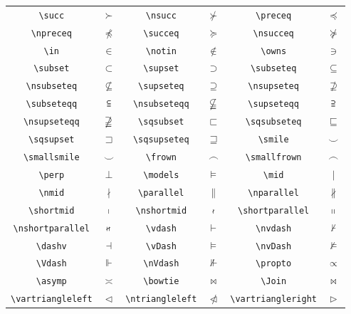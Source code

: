 \begin{tabular}{cc|cc|cc}
    \lstinline!\succ! & $\succ$ & \lstinline!\nsucc! & $\nsucc$ & \lstinline!\preceq! & $\preceq$ \\
    \lstinline!\npreceq! & $\npreceq$  & \lstinline!\succeq! & $\succeq$ & \lstinline!\nsucceq! & $\nsucceq$ \\
    \lstinline!\in! & $\in$ & \lstinline!\notin! & $\notin$ & \lstinline!\owns! & $\owns$ \\
    \lstinline!\subset! & $\subset$ & \lstinline!\supset! & $\supset$ & \lstinline!\subseteq! & $\subseteq$ \\
    \lstinline!\nsubseteq! & $\nsubseteq$ & \lstinline!\supseteq! & $\supseteq$ & \lstinline!\nsupseteq! & $\nsupseteq$ \\
    \lstinline!\subseteqq! & $\subseteqq$ & \lstinline!\nsubseteqq! & $\nsubseteqq$ & \lstinline!\supseteqq! & $\supseteqq$ \\
    \lstinline!\nsupseteqq! & $\nsupseteqq$ & \lstinline!\sqsubset! & $\sqsubset$ & \lstinline!\sqsubseteq! & $\sqsubseteq$ \\
    \lstinline!\sqsupset! & $\sqsupset$ & \lstinline!\sqsupseteq! & $\sqsupseteq$ & \lstinline!\smile! & $\smile$ \\
    \lstinline!\smallsmile! & $\smallsmile$ & \lstinline!\frown! & $\frown$ & \lstinline!\smallfrown! & $\smallfrown$ \\
    \lstinline!\perp! & $\perp$ & \lstinline!\models! & $\models$ & \lstinline!\mid! & $\mid$ \\
    \lstinline!\nmid! & $\nmid$ & \lstinline!\parallel! & $\parallel$ & \lstinline!\nparallel! & $\nparallel$ \\
    \lstinline!\shortmid! & $\shortmid$ & \lstinline!\nshortmid! & $\nshortmid$ & \lstinline!\shortparallel! & $\shortparallel$ \\
    \lstinline!\nshortparallel! & $\nshortparallel$ & \lstinline!\vdash! & $\vdash$ & \lstinline!\nvdash! & $\nvdash$ \\
    \lstinline!\dashv! & $\dashv$ & \lstinline!\vDash! & $\vDash$ & \lstinline!\nvDash! & $\nvDash$ \\
    \lstinline!\Vdash! & $\Vdash $ & \lstinline!\nVdash! & $\nVdash$ & \lstinline!\propto! & $\propto$ \\
    \lstinline!\asymp! & $\asymp$ & \lstinline!\bowtie! & $\bowtie$ & \lstinline!\Join! & $\Join$ \\
    \lstinline!\vartriangleleft! & $\vartriangleleft$ & \lstinline!\ntriangleleft! & $\ntriangleleft$ & \lstinline!\vartriangleright! & $\vartriangleright$ \\

\end{tabular}
